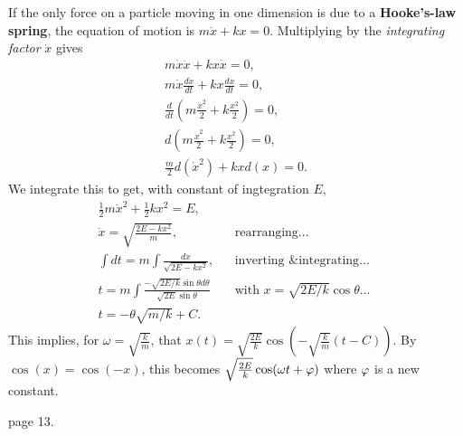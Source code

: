 \begin{remark}
    If the only force on a particle moving in one dimension is due to a \textbf{Hooke's-law spring}, the equation of motion is $m\ddot{x} + kx = 0$. Multiplying by the \emph{integrating factor} $\dot{x}$ gives 
    \begin{align*}
        m\dot{x}\ddot{x} + kx\dot{x} = 0, \\
        m\dot{x}\frac{d\dot{x}}{dt} + kx\frac{dx}{dt} = 0, \\
        \frac{d}{dt}(m\frac{\dot{x}^2}{2} + k\frac{x^2}{2}) = 0, \\
        d(m\frac{\dot{x}^2}{2} + k\frac{x^2}{2}) = 0, \\
        \frac{m}{2}d(\dot{x}^2) + kxd(x) = 0.
    \end{align*}
    We integrate this to get, with constant of ingtegration $E$,
    \begin{align*}
        \frac{1}{2}m\dot{x}^2 + \frac{1}{2}kx^2 = E, \\
        \dot{x} = \sqrt{\frac{2E - kx^2}{m}}, && \text{rearranging...} \\
        \int dt = m \int\frac{dx}{\sqrt{2E - kx^2}}, && \text{inverting \& integrating... } \\
        t = m \int\frac{-\sqrt{2E/k}\sin\theta d\theta}{\sqrt{2E}\sin\theta} && \text{with } x = \sqrt{2E/k}\cos\theta \text{...} \\
        t = -\theta\sqrt{m/k} + C.
    \end{align*}
    This implies, for $\omega = \sqrt{\frac{k}{m}}$, that $x(t) = \sqrt{\frac{2E}{k}}\cos(-\sqrt{\frac{k}{m}}(t-C))$. By $\cos(x) = \cos(-x)$, this becomes $\sqrt{\frac{2E}{k}}\cos(\omega t + \varphi)$ where $\varphi$ is a new constant.
\end{remark}

page 13. 